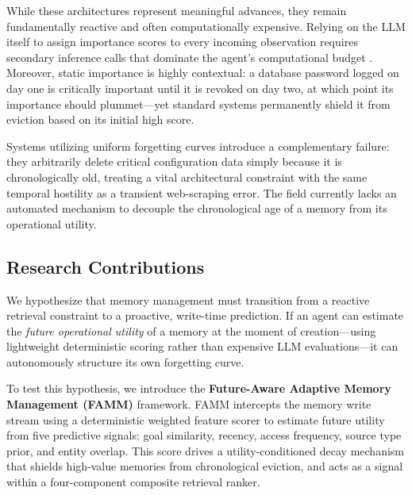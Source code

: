 \documentclass[conference]{IEEEtran}
\begin{document}
While these architectures represent meaningful advances, they remain fundamentally reactive and often computationally expensive. Relying on the LLM itself to assign importance scores to every incoming observation requires secondary inference calls that dominate the agent's computational budget \cite{xu2023llm}. Moreover, static importance is highly contextual: a database password logged on day one is critically important until it is revoked on day two, at which point its importance should plummet---yet standard systems permanently shield it from eviction based on its initial high score.

Systems utilizing uniform forgetting curves introduce a complementary failure: they arbitrarily delete critical configuration data simply because it is chronologically old, treating a vital architectural constraint with the same temporal hostility as a transient web-scraping error. The field currently lacks an automated mechanism to decouple the chronological age of a memory from its operational utility.

\subsection{Research Contributions}
We hypothesize that memory management must transition from a reactive retrieval constraint to a proactive, write-time prediction. If an agent can estimate the \textit{future operational utility} of a memory at the moment of creation---using lightweight deterministic scoring rather than expensive LLM evaluations---it can autonomously structure its own forgetting curve.

To test this hypothesis, we introduce the \textbf{Future-Aware Adaptive Memory Management (FAMM)} framework. FAMM intercepts the memory write stream using a deterministic weighted feature scorer to estimate future utility from five predictive signals: goal similarity, recency, access frequency, source type prior, and entity overlap. This score drives a utility-conditioned decay mechanism that shields high-value memories from chronological eviction, and acts as a signal within a four-component composite retrieval ranker.
\end{document}
